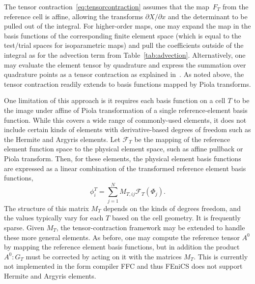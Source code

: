 The tensor contraction~\eqref{eq:tensorcontraction} assumes that the
map~$F_T$ from the reference cell is affine, allowing the transforms
$\partial X / \partial x$ and the determinant to be pulled out of the
integral. For higher-order maps, one may expand the map in the basis
functions of the corresponding finite element space (which is equal to
the test/trial spaces for isoparametric maps) and pull the
coefficients outside of the integral as for the advection term from
Table~\ref{tab:advection}. Alternatively, one may evaluate the element
tensor by quadrature and express the summation over quadrature points
as a tensor contraction as explained in~\cite{KirbyLogg2006}.  As
noted above, the tensor contraction readily extends to basis functions
mapped by Piola transforms.

One limitation of this approach is it requires each basis function on
a cell \( T \) to be the image under affine of Piola transformation of
a single reference-element basis function.  While this covers a wide
range of commonly-used elements, it does not include certain kinds of
elements with derivative-based degrees of freedom such as the Hermite
and Argyris elements.  Let \( \mathcal{F}_T \) be the mapping of the
reference element function space to the physical element space, such
as affine pullback or Piola transform.  Then, for these elements, the
physical element basis functions are expressed as a linear combination
of the transformed reference element basis functions,
\begin{equation}
\phi^T_i = \sum_{j=1}^N M_{T,{ij}} \mathcal{F}_T \left( \Phi_j \right).
\end{equation}
The structure of this matrix \( M_T \) depends on the kinds of degrees
freedom, and the values typically vary for each \( T \) based on the
cell geometry.  It is frequently sparse.  Given \( M_T \), the
tensor-contraction framework may be extended to handle these more
general elements.  As before, one may compute the reference tensor \(
A^0 \) by mapping the reference element basis functions, but in
addition the product \( A^0 : G_T \) must be corrected by acting on it
with the matrices \( M_T \). This is currently not implemented in the
form compiler FFC and thus FEniCS does not support Hermite and Argyris
elements.

